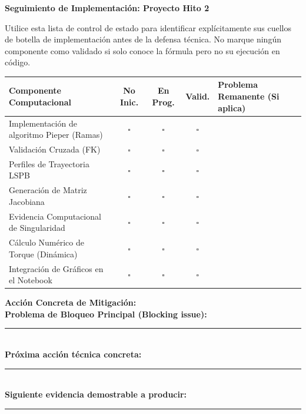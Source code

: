 \documentclass[11pt, a4paper]{article}
\begin{document}
\begin{center}
    \Large\textbf{\textcolor{ucbblue}{Seguimiento de Implementación: Proyecto Hito 2}}\\[0.2cm]
\end{center}

\begin{tcolorbox}[colback=yellow!10, colframe=black, title=\textbf{Gestión de Proyecto}]
    Utilice esta lista de control de estado para identificar explícitamente sus cuellos de botella de implementación antes de la defensa técnica. No marque ningún componente como validado si solo conoce la fórmula pero no su ejecución en código.
\end{tcolorbox}

\vspace{0.4cm}
\renewcommand{\arraystretch}{1.8}
\begin{tabularx}{\textwidth}{|>{\raggedright\arraybackslash}X|c|c|c|>{\raggedright\arraybackslash}p{4cm}|}
\hline
\rowcolor{ucbblue!10} \textbf{Componente Computacional} & \textbf{No Inic.} & \textbf{En Prog.} & \textbf{Valid.} & \textbf{Problema Remanente (Si aplica)} \\ \hline
Implementación de algoritmo Pieper (Ramas) & $\square$ & $\square$ & $\square$ & \\ \hline
Validación Cruzada (FK) & $\square$ & $\square$ & $\square$ & \\ \hline
Perfiles de Trayectoria LSPB & $\square$ & $\square$ & $\square$ & \\ \hline
Generación de Matriz Jacobiana & $\square$ & $\square$ & $\square$ & \\ \hline
Evidencia Computacional de Singularidad & $\square$ & $\square$ & $\square$ & \\ \hline
Cálculo Numérico de Torque (Dinámica) & $\square$ & $\square$ & $\square$ & \\ \hline
Integración de Gráficos en el Notebook & $\square$ & $\square$ & $\square$ & \\ \hline
\end{tabularx}

\vspace{1cm}
\textbf{Acción Concreta de Mitigación:}\\[0.3cm]
\textbf{Problema de Bloqueo Principal (Blocking issue):} \rule{8.5cm}{0.15mm} \\[0.5cm]
\textbf{Próxima acción técnica concreta:} \rule{9.5cm}{0.15mm} \\[0.5cm]
\textbf{Siguiente evidencia demostrable a producir:} \rule{8.5cm}{0.15mm}
\end{document}
